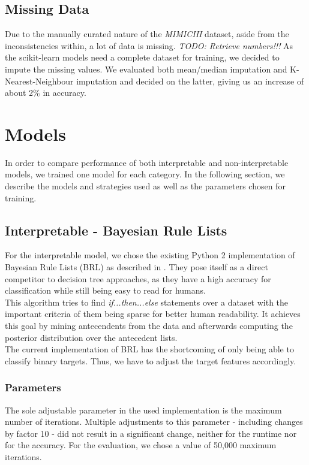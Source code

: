 \documentclass[conference,compsoc]{IEEEtran}
\begin{document}
\subsection{Missing Data}
Due to the manually curated nature of the \emph{MIMICIII} dataset, aside from the inconsistencies within, a lot of data is missing. 
\emph{TODO: Retrieve numbers!!!}
As the scikit-learn models need a complete dataset for training, we decided to impute the missing values. 
We evaluated both mean/median imputation and K-Nearest-Neighbour imputation and decided on the latter, giving us an increase of about 2\% in accuracy.


\section{Models}
In order to compare performance of both interpretable and non-interpretable models, we trained one model for each category. 
In the following section, we describe the models and strategies used as well as the parameters chosen for training.

\subsection{Interpretable - Bayesian Rule Lists}
For the interpretable model, we chose the existing Python 2 implementation of Bayesian Rule Lists (BRL) as described in \cite{Letham2015}. 
They pose itself as a direct competitor to decision tree approaches, as they have a high accuracy for classification while still being easy to read for humans. \\
This algorithm tries to find \emph{if...then...else} statements over a dataset with the important criteria of them being sparse for better human readability. 
It achieves this goal by mining antecendents from the data and afterwards computing the posterior distribution over the antecedent lists.\\
The current implementation of BRL has the shortcoming of only being able to classify binary targets. 
Thus, we have to adjust the target features accordingly.
\subsubsection{Parameters}
The sole adjustable parameter in the used implementation is the maximum number of iterations. 
Multiple adjustments to this parameter - including changes by factor 10 - did not result in a significant change, neither for the runtime nor for the accuracy. 
For the evaluation, we chose a value of 50,000 maximum iterations.
\end{document}
